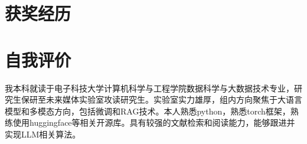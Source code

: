 \documentclass{resume}
\begin{document}
\section{获奖经历}

\section{自我评价}
\quad \quad 我本科就读于电子科技大学计算机科学与工程学院数据科学与大数据技术专业，研究生保研至未来媒体实验室攻读研究生。实验室实力雄厚，组内方向聚焦于大语言模型和多模态方向，包括微调和RAG技术。本人熟悉python，熟悉torch框架，熟练使用huggingface等相关开源库。具有较强的文献检索和阅读能力，能够跟进并实现LLM相关算法。
\end{document}
